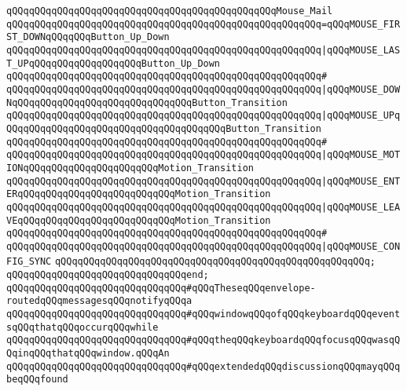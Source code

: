 \verb|qQQqqQQqqQQqqQQqqQQqqQQqqQQqqQQqqQQqqQQqqQQqqQQqMouse_Mail|\newline
\verb|qQQqqQQqqQQqqQQqqQQqqQQqqQQqqQQqqQQqqQQqqQQqqQQqqQQqqQQq=qQQqMOUSE_FIRST_DOWNqQQqqQQqButton_Up_Down|\newline
\verb|qQQqqQQqqQQqqQQqqQQqqQQqqQQqqQQqqQQqqQQqqQQqqQQqqQQqqQQq|\verb#|qQQqMOUSE_LAST_UPqQQqqQQqqQQqqQQqqQQqButton_Up_Down#\newline
\verb|qQQqqQQqqQQqqQQqqQQqqQQqqQQqqQQqqQQqqQQqqQQqqQQqqQQqqQQq#|\newline
\verb|qQQqqQQqqQQqqQQqqQQqqQQqqQQqqQQqqQQqqQQqqQQqqQQqqQQqqQQq|\verb#|qQQqMOUSE_DOWNqQQqqQQqqQQqqQQqqQQqqQQqqQQqqQQqButton_Transition#\newline
\verb|qQQqqQQqqQQqqQQqqQQqqQQqqQQqqQQqqQQqqQQqqQQqqQQqqQQqqQQq|\verb#|qQQqMOUSE_UPqQQqqQQqqQQqqQQqqQQqqQQqqQQqqQQqqQQqqQQqButton_Transition#\newline
\verb|qQQqqQQqqQQqqQQqqQQqqQQqqQQqqQQqqQQqqQQqqQQqqQQqqQQqqQQq#|\newline
\verb|qQQqqQQqqQQqqQQqqQQqqQQqqQQqqQQqqQQqqQQqqQQqqQQqqQQqqQQq|\verb#|qQQqMOUSE_MOTIONqQQqqQQqqQQqqQQqqQQqqQQqMotion_Transition#\newline
\verb|qQQqqQQqqQQqqQQqqQQqqQQqqQQqqQQqqQQqqQQqqQQqqQQqqQQqqQQq|\verb#|qQQqMOUSE_ENTERqQQqqQQqqQQqqQQqqQQqqQQqqQQqMotion_Transition#\newline
\verb|qQQqqQQqqQQqqQQqqQQqqQQqqQQqqQQqqQQqqQQqqQQqqQQqqQQqqQQq|\verb#|qQQqMOUSE_LEAVEqQQqqQQqqQQqqQQqqQQqqQQqqQQqMotion_Transition#\newline
\verb|qQQqqQQqqQQqqQQqqQQqqQQqqQQqqQQqqQQqqQQqqQQqqQQqqQQqqQQq#|\newline
\verb|qQQqqQQqqQQqqQQqqQQqqQQqqQQqqQQqqQQqqQQqqQQqqQQqqQQqqQQq|\verb#|qQQqMOUSE_CONFIG_SYNC#\newline
\verb|qQQqqQQqqQQqqQQqqQQqqQQqqQQqqQQqqQQqqQQqqQQqqQQqqQQqqQQq;|\newline
\verb|qQQqqQQqqQQqqQQqqQQqqQQqqQQqqQQqend;|\newline
\newline
\verb|qQQqqQQqqQQqqQQqqQQqqQQqqQQqqQQq#qQQqTheseqQQqenvelope-routedqQQqmessagesqQQqnotifyqQQqa|\newline
\verb|qQQqqQQqqQQqqQQqqQQqqQQqqQQqqQQq#qQQqwindowqQQqofqQQqkeyboardqQQqeventsqQQqthatqQQqoccurqQQqwhile|\newline
\verb|qQQqqQQqqQQqqQQqqQQqqQQqqQQqqQQq#qQQqtheqQQqkeyboardqQQqfocusqQQqwasqQQqinqQQqthatqQQqwindow.qQQqAn|\newline
\verb|qQQqqQQqqQQqqQQqqQQqqQQqqQQqqQQq#qQQqextendedqQQqdiscussionqQQqmayqQQqbeqQQqfound|\newline
